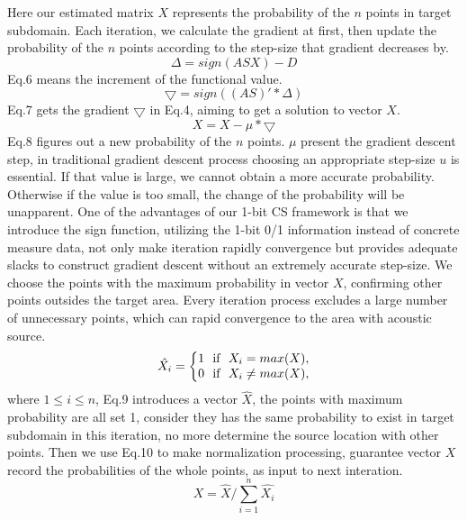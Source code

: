 Here our estimated matrix $X$ represents the probability of the $n$ points in target subdomain. Each iteration, we calculate the gradient at first, then update the probability of the $n$ points according to the step-size that gradient decreases by. 
\begin{equation}\label{eq:eps}
\varDelta=sign(ASX)-D
 \end{equation}Eq.6 means the increment of the functional value.
 \begin{equation}\label{eq:eps}
\bigtriangledown=sign((AS)'*\varDelta)
 \end{equation}Eq.7 gets the gradient $\bigtriangledown$ in Eq.4, aiming to get a solution to vector $X$. 
 \begin{equation}\label{eq:eps}
X=X-\mu *\bigtriangledown
 \end{equation}Eq.8 figures out a new probability of the $n$ points. $\mu$ present the gradient descent step, in traditional gradient descent process choosing an appropriate step-size $u$ is essential. If that value is large, we cannot obtain a more accurate probability. Otherwise if the value is too small, the change of the probability will be unapparent. One of the advantages of our 1-bit CS framework is that we introduce the sign function,  utilizing the 1-bit 0/1 information instead of concrete measure data, not only make iteration rapidly convergence but provides adequate slacks to construct gradient descent without an extremely accurate step-size. We choose the points with the maximum probability in vector $X$, confirming other points outsides the target area. Every iteration process excludes a large number of unnecessary points, which can rapid convergence to the area with acoustic source.
 \begin{equation}\label{eq:eps}
\hat{X_{i}}=
\left\{\begin{matrix}
1 ~~ $if$~~    X_i=max(X),\\
0 ~~ $if$~~   X_i \neq max(X),
\end{matrix}\right.
 \end{equation}where $1\leq i \leq n$, Eq.9 introduces a vector $\hat{X}$,  the points with maximum probability are all set 1, consider they  has the same probability to exist in target subdomain in this iteration,  no more determine the source location with other points. Then we use Eq.10 to make normalization processing, guarantee vector $X$ record the probabilities of the whole points, as input to next interation.
 \begin{equation}\label{eq:eps}
 X=\hat{X}/\sum\limits_{i=1}^n\hat{X_{i}}
 \end{equation}
 

